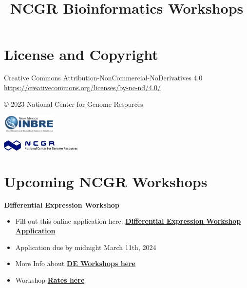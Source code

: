 \documentclass[
]{book}
\title{NCGR Bioinformatics Workshops}
\author{}
\date{\vspace{-2.5em}}
\begin{document}
\maketitle

{
\setcounter{tocdepth}{1}
\tableofcontents
}
\hypertarget{license-and-copyright}{%
\chapter*{License and Copyright}\label{license-and-copyright}}

Creative Commons Attribution-NonCommercial-NoDerivatives 4.0
\url{https://creativecommons.org/licenses/by-nc-nd/4.0/}

© 2023 National Center for Genome Resources

\includegraphics[width=0.2\textwidth,height=\textheight]{./Figures/INBRE_Logo_Grad_transparent-2019.png}

\includegraphics[width=0.3\textwidth,height=\textheight]{./Figures/ncgr.png}

\hypertarget{upcoming-ncgr-workshops}{%
\chapter*{Upcoming NCGR Workshops}\label{upcoming-ncgr-workshops}}

\textbf{Differential Expression Workshop}

\begin{itemize}
\item
  Fill out this online application here:
  \href{https://docs.google.com/forms/d/e/1FAIpQLScpoKxE0yAnCK3yOl5hBde7MtOWCOeXYxvjBfWyDcA9hHDGrw/viewform}{\textbf{Differential Expression Workshop Application}}
\item
  Application due by midnight March 11th, 2024
\item
  More Info about \href{https://inbre.ncgr.org/ncgr-INBRE-2024/differential-expression-workshop.html\#differential-expression-workshop}{\textbf{DE Workshops here}}
\item
  Workshop \href{https://inbre.ncgr.org/ncgr-INBRE-2024/workshop-rates.html\#workshop-rates}{\textbf{Rates here}}
\end{itemize}
\end{document}
